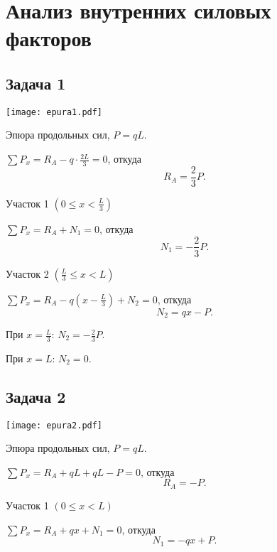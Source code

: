 \chapter{Анализ внутренних силовых факторов}

\section{Задача 1}

\begin{floatingfigure}[r]{0.5\textwidth}
    \centering
    \texttt{[image: epura1.pdf]}
    \caption{Эпюра продольных сил, $P = qL$.}
    \label{fig:chap1-epura1}
\end{floatingfigure}

$\sum P_x = R_A - q \cdot \frac{2L}{3} = 0$,
откуда
\[
    R_A = \frac{2}{3} P.
\]

\vspace{1.5ex}

Участок 1 $ \left(0 \le x < \frac{L}{3}\right)$

$\sum P_{x} = R_A + N_1 = 0$,
откуда
\[
    N_1 = -\frac{2}{3} P.
\]

\vspace{1.5ex}

Участок 2 $ \left(\frac{L}{3} \le x < L\right)$

$\sum P_{x} = R_A - q \left(x - \frac{L}{3}\right) + N_2= 0$,
откуда
\[
    N_2 = qx - P.
\]

При $x = \frac{L}{3}$: $N_2 = -\frac{2}{3} P$.

При $x = L$: $N_2 = 0$.

\newpage


\section{Задача 2}

\begin{floatingfigure}[r]{0.5\textwidth}
    \centering
    \texttt{[image: epura2.pdf]}
    \caption{Эпюра продольных сил, $P = qL$.}
    \label{fig:chap1-epura2}
\end{floatingfigure}

$\sum P_x = R_A + qL + qL - P = 0$,
откуда
\[
    R_A = -P.
\]

\vspace{1.5ex}

Участок 1 $\left(0 \le x < L\right)$

$\sum P_{x} = R_A + qx + N_1= 0$,
откуда
\[
    N_1 = -qx + P.
\]

